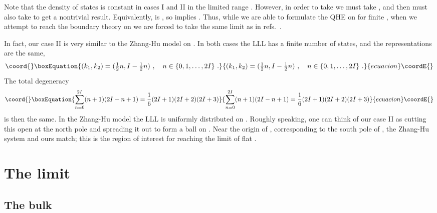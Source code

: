 \documentclass[a4paper,12pt]{article}
\providecommand{\R}{R}
\providecommand{\sect}[1]{\section{#1}\setcounter{equation}{0}}
\providecommand{\half}{{\textstyle \frac{1}{2}}}
\begin{document}
Note that
the density of states is constant in cases I and II in the limited range
\coordHE{}.  However, in order to take \coordHE{} we must take
\coordHE{}, and then must also take \coordHE{} to get a nontrivial result.
Equivalently, \coordHE{} is \coordHE{}, so \coordHE{} implies \coordHE{}.  Thus, while we are able to formulate the \coordHE{} QHE on \myHighlight{$\R^4$}\coordHE{}
for finite
\coordHE{}, when we attempt to reach the boundary theory on \myHighlight{$\R^3$}\coordHE{} we are forced to
take the same limit as in refs.~\cite{hz1,hz2}.  

In fact, our case II is very
similar to the Zhang-Hu model on \coordHE{}.  In both cases the LLL has a finite
number of states, and the \coordHE{} representations are the same,
\begin{equation}\coord{}\boxEquation{
(k_1,k_2) = (\half n, I - \half n)\ ,\quad n\in \{ 0,1,\ldots,2I\}\ .
}{
(k_1,k_2) = (\half n, I - \half n)\ ,\quad n\in \{ 0,1,\ldots,2I\}\ .
}{ecuacion}\coordE{}\end{equation}
The total degeneracy 
\begin{equation}\coord{}\boxEquation{
\sum_{n=0}^{2I} (n+1)(2I - n + 1) = \frac{1}{6}(2I+1)(2I+2)(2I+3)
}{
\sum_{n=0}^{2I} (n+1)(2I - n + 1) = \frac{1}{6}(2I+1)(2I+2)(2I+3)
}{ecuacion}\coordE{}\end{equation}
is then the same.  In the Zhang-Hu model the LLL is uniformly distributed
on \coordHE{}.  Roughly speaking, one can think of our case II as cutting this
open at the north pole and spreading it out to form a ball on \myHighlight{$\R^4$}\coordHE{}.  Near
the origin of \myHighlight{$\R^4$}\coordHE{}, corresponding to the south pole of \coordHE{}, the Zhang-Hu
system and ours match; this is the region of interest for reaching the
limit of flat \myHighlight{$\R^3$}\coordHE{}.

\sect{The \coordHE{} limit}

\subsection{The bulk}
\end{document}
